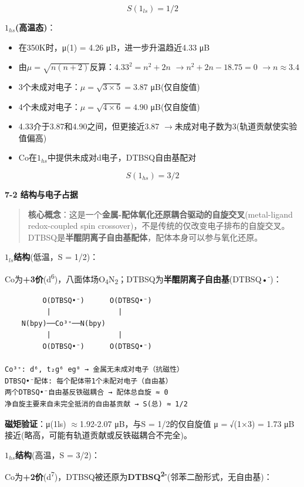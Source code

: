 \documentclass[a4paper,11pt]{ctexart}
\providecommand{\tightlist}{\setlength{\itemsep}{0pt}\setlength{\parskip}{0pt}}
\newcommand{\箭}{\ensuremath{\rightarrow}}
\newcommand{\左箭}{\ensuremath{\leftarrow}}
\newcommand{\上箭}{\ensuremath{\uparrow}}
\newcommand{\下箭}{\ensuremath{\downarrow}}
\newcommand{\衡}{\ensuremath{\rightleftharpoons}}
\newcommand{\双箭}{\ensuremath{\leftrightarrow}}
\newcommand{\约等于}{\ensuremath{\approx}}
\newcommand{\小于等于}{\ensuremath{\leq}}
\newcommand{\大于等于}{\ensuremath{\geq}}
\newcommand{\不等于}{\ensuremath{\neq}}
\newcommand{\西格马}{\ensuremath{\sigma}}
\newcommand{\派}{\ensuremath{\pi}}
\begin{document}
\[\boxed{S(1_{ls}) = 1/2}\]

\textbf{\(1_{hs}\)(高温态)}：

\begin{itemize}
\tightlist
\item
  在350K时，μ(1) = 4.26 μB，进一步升温趋近4.33 μB
\item
  由\(\mu = \sqrt{n(n+2)}\)反算：\(4.33^2 = n^2 + 2n\) \箭 \(n^2 + 2n - 18.75 = 0\) \箭 \(n \approx 3.4\)
\item
  3个未成对电子：\(\mu = \sqrt{3 \times 5} = 3.87\) μB(仅自旋值)
\item
  4个未成对电子：\(\mu = \sqrt{4 \times 6} = 4.90\) μB(仅自旋值)
\item
  4.33介于3.87和4.90之间，但更接近3.87 \箭 未成对电子数为3(轨道贡献使实验值偏高)
\item
  Co在\(1_{hs}\)中提供未成对d电子，DTBSQ自由基配对
\end{itemize}

\[\boxed{S(1_{hs}) = 3/2}\]

\textbf{7-2 结构与电子占据}

\begin{quote}
\textbf{核心概念}：这是一个\textbf{金属-配体氧化还原耦合驱动的自旋交叉}(metal-ligand redox-coupled spin crossover)，不是传统的仅改变电子排布的自旋交叉。DTBSQ是\textbf{半醌阴离子自由基配体}，配体本身可以参与氧化还原。
\end{quote}

\textbf{\(1_{ls}\)结构}(低温，S = 1/2)：

Co为\textbf{+3价}(d\textsuperscript{6})，八面体场O\textsubscript{4}N\textsubscript{2}；DTBSQ为\textbf{半醌阴离子自由基}(DTBSQ•\textsuperscript{-})：

\begin{verbatim}
         O(DTBSQ•⁻)      O(DTBSQ•⁻)
          |                |
    N(bpy)──Co³⁺──N(bpy)
          |                |
         O(DTBSQ•⁻)      O(DTBSQ•⁻)

Co³⁺: d⁶, t₂g⁶ eg⁰ → 金属无未成对电子（抗磁性）
DTBSQ•⁻配体: 每个配体带1个未配对电子（自由基）
两个DTBSQ•⁻自由基反铁磁耦合 → 配体总自旋 ≈ 0
净自旋主要来自未完全抵消的自由基贡献 → S(总) ≈ 1/2
\end{verbatim}

\textbf{磁矩验证}：μ(1ls) \约等于 1.92-2.07 μB，与S = 1/2的仅自旋值 μ = √(1×3) = 1.73 μB 接近(略高，可能有轨道贡献或反铁磁耦合不完全)。

\textbf{\(1_{hs}\)结构}(高温，S = 3/2)：

Co为\textbf{+2价}(d\textsuperscript{7})，DTBSQ被还原为\textbf{DTBSQ\textsuperscript{2-}}(邻苯二酚形式，无自由基)：
\end{document}
